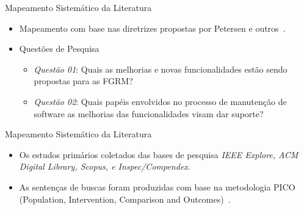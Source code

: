 \documentclass[t,14pt,mathserif]{beamer}
\begin{document}
\begin{frame}{Mapeamento Sistemático da Literatura}

    \begin{itemize}
        \item Mapeamento com base nas diretrizes propostas por Petersen e
            outros~\cite{Petersen2008}.
        \item Questões de Pesquisa
            \begin{itemize}
                \item \textit{Questão 01}: Quais as melhorias e novas
                funcionalidades estão sendo propostas para as FGRM?
                \item \textit{Questão 02}: Quais papéis envolvidos no processo de
                    manutenção de software as melhorias das funcionalidades visam
                    dar suporte?
            \end{itemize}
    \end{itemize}

\end{frame}

\begin{frame}{Mapeamento Sistemático da Literatura}

    \begin{itemize}
       \item Os estudos primários coletados das bases de pesquisa \textit{IEEE
             Explore, ACM Digital Library, Scopus, e Inspec/Compendex}.
     \item As sentenças de buscas foram produzidas com base na metodologia PICO
          (Population, Intervention, Comparison and
          Outcomes)~\cite{keele2007guidelines}.
    \end{itemize}

\end{frame}
\end{document}
